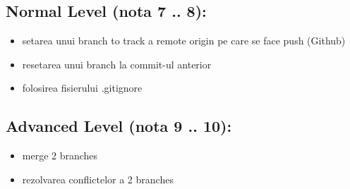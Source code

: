 \documentclass[12pt]{article}
\begin{document}
\subsection{Normal Level (nota 7 .. 8):}
\begin{itemize}
\item setarea unui branch to track a remote origin pe care se face push (Github)
\item resetarea unui branch la commit-ul anterior
\item folosirea fisierului .gitignore
\end{itemize}
\subsection{Advanced Level (nota 9 .. 10):}
\begin{itemize}
\item merge 2 branches
\item rezolvarea conflictelor a 2 branches
\end{itemize}
\end{document}
